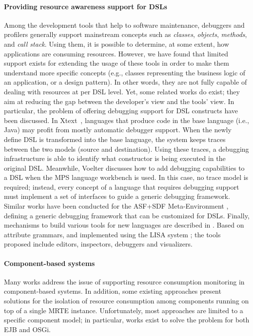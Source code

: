 \paragraph{Providing resource awareness support for DSLs}
Among the development tools that help to software maintenance, debuggers and profilers generally support mainstream concepts such as \textit{classes}, \textit{objects}, \textit{methods}, and \textit{call stack}.
Using them, it is possible to determine, at some extent, how applications are consuming resources.
However, we have found that limited support exists for extending the usage of these tools in order to make them understand more specific concepts (e.g., classes representing the business logic of an application, or a design pattern).
In other words, they are not fully capable of dealing with resources at per DSL level.
Yet, some related works do exist; they aim at reducing the gap between the developer's view and the tools' view.
In particular, the problem of offering debugging support for DSL constructs have been discussed.
In Xtext~\cite{Eysholdt:2010:XIY:1869542.1869625}, languages that produce code in the base language (i.e., Java) may profit from mostly automatic debugger support.
When the newly define DSL is transformed into the base language, the system keeps traces between the two models (source and destination).
Using these traces, a debugging infrastructure is able to identify what constructor is being executed in the original DSL.
Meanwhile, Voelter \cite{Voelter2010} discusses how to add debugging capabilities to a DSL when the MPS language workbench is used.
In this case, no trace model is required; instead, every concept of a language that requires debugging support must implement a set of interfaces to guide a generic debugging framework.
Similar works have been conducted \cite{vandenBrand:2005:TGD:1705513.1705667} for the ASF+SDF Meta-Environment \cite{vandenBrand20013}, defining a generic debugging framework that can be customized for DSLs.
Finally, mechanisms to build various tools for new languages are described in \cite{Henriques2005}.
Based on attribute grammars, and implemented using the LISA system \cite{Mernik2002}; the tools proposed include editors, inspectors, debuggers and visualizers.

\paragraph{Component-based systems}

Many works address the issue of supporting resource consumption monitoring in component-based systems.
In addition, some existing approaches present solutions for the isolation of resource consumption among components running on top of a single MRTE instance.
Unfortunately, most approaches are limited to a specific component model; in particular, works exist to solve the problem for both EJB and OSGi.

